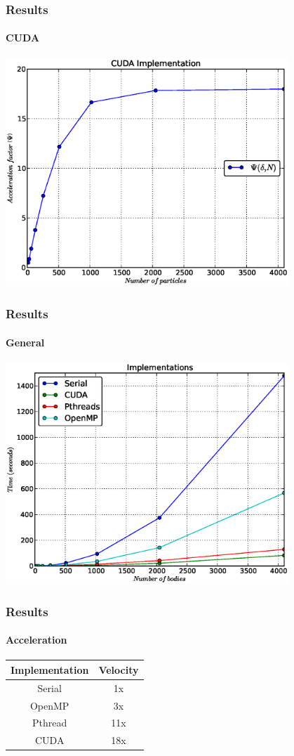 \frame
{
\frametitle{Results}
\framesubtitle{CUDA}
\begin{center}
    \includegraphics[width=0.8\textwidth]{img/cuda}
\end{center}
}

\frame
{
\frametitle{Results}
\framesubtitle{General}
\begin{center}
    \includegraphics[width=0.8\textwidth]{img/all}
\end{center}
}

\frame
{
\frametitle{Results}
\framesubtitle{Acceleration}
\begin{center}
    \begin{tabular}{|c|c|}
        \hline
        \textbf{Implementation} & \textbf{Velocity} \\\hline
        Serial  & 1x  \\\hline
        OpenMP  & 3x  \\\hline
        Pthread & 11x \\\hline
        CUDA    & 18x \\\hline
    \end{tabular}
\end{center}
}
